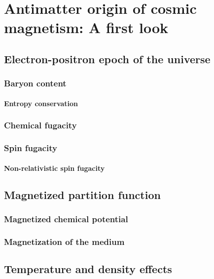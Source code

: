 \chapter{Antimatter origin of cosmic magnetism: A first look}
    \section{Electron-positron epoch of the universe}
        \subsection{Baryon content}
            \subsubsection{Entropy conservation}
        \subsection{Chemical fugacity}
        \subsection{Spin fugacity}
            \subsubsection{Non-relativistic spin fugacity}
    \section{Magnetized partition function}
        \subsection{Magnetized chemical potential}
        \subsection{Magnetization of the medium}
    \section{Temperature and density effects}